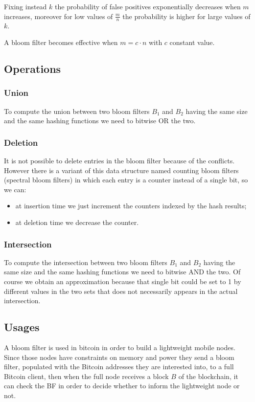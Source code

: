 Fixing instead $k$ the probability of false positives exponentially decreases when $m$ increases, moreover for low values of $\frac{m}{n}$ the probability is higher for large values of $k$.

A bloom filter becomes effective when $m = c \cdot n$ with $c$ constant value.

\subsection{Operations}
\subsubsection{Union}
To compute the union between two bloom filters $B_1$ and $B_2$ having the same size and the same hashing functions we need to bitwise OR the two.

\subsubsection{Deletion}
It is not possible to delete entries in the bloom filter because of the conflicts.
However there is a variant of this data structure named counting bloom filters (spectral bloom filters) in which each entry is a counter instead of a single bit, so we can:
\begin{itemize}
    \item at insertion time we just increment the counters indexed by the hash results;
    \item at deletion time we decrease the counter.
\end{itemize}

\subsubsection{Intersection}
To compute the intersection between two bloom filters $B_1$ and $B_2$ having the same size and the same hashing functions we need to bitwise AND the two.
Of course we obtain an approximation because that single bit could be set to 1 by different values in the two sets that does not necessarily appears in the actual intersection.

\subsection{Usages}
A bloom filter is used in bitcoin in order to build a lightweight mobile nodes.
Since those nodes have constraints on memory and power they send a bloom filter, populated with the Bitcoin addresses they are interested into, to a full Bitcoin client, then when the full node receives a block $B$ of the blockchain, it can check the BF in order to decide whether to inform the lightweight node or not.

